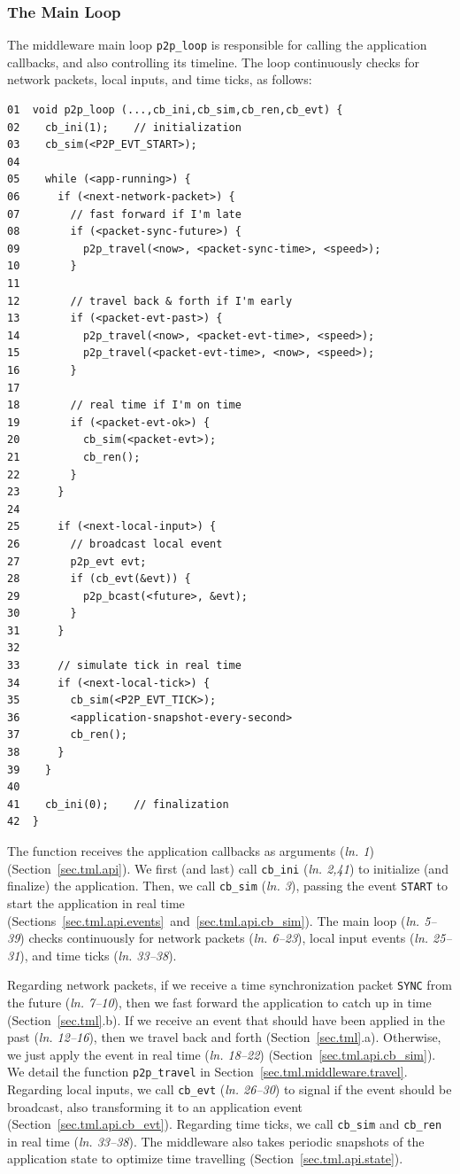 \documentclass[10pt,journal,compsoc]{IEEEtran}
\newcommand{\code}[1]  {\texttt{\footnotesize{#1}}}
\newcommand{\lin}[1]{(\emph{ln. #1}\xspace)}
\begin{document}
\subsubsection{The Main Loop}
\label{sec.tml.middleware.loop}

The middleware main loop \code{p2p\_loop} is responsible for calling the
application callbacks, and also controlling its timeline.
The loop continuously checks for network packets, local inputs, and time ticks,
as follows:

{\footnotesize
\begin{verbatim}
01  void p2p_loop (...,cb_ini,cb_sim,cb_ren,cb_evt) {
02    cb_ini(1);    // initialization
03    cb_sim(<P2P_EVT_START>);
04
05    while (<app-running>) {
06      if (<next-network-packet>) {
07        // fast forward if I'm late
08        if (<packet-sync-future>) {
09          p2p_travel(<now>, <packet-sync-time>, <speed>);
10        }
11
12        // travel back & forth if I'm early
13        if (<packet-evt-past>) {
14          p2p_travel(<now>, <packet-evt-time>, <speed>);
15          p2p_travel(<packet-evt-time>, <now>, <speed>);
16        }
17
18        // real time if I'm on time
19        if (<packet-evt-ok>) {
20          cb_sim(<packet-evt>);
21          cb_ren();
22        }
23      }
24
25      if (<next-local-input>) {
26        // broadcast local event
27        p2p_evt evt;
28        if (cb_evt(&evt)) {
29          p2p_bcast(<future>, &evt);
30        }
31      }
32
33      // simulate tick in real time
34      if (<next-local-tick>) {
35        cb_sim(<P2P_EVT_TICK>);
36        <application-snapshot-every-second>
37        cb_ren();
38      }
39    }
40
41    cb_ini(0);    // finalization
42  }
\end{verbatim}
}

The function receives the application callbacks as arguments \lin{1}
(Section~\ref{sec.tml.api}).
We first (and last) call \code{cb\_ini} \lin{2,41} to initialize (and finalize)
the application.
Then, we call \code{cb\_sim} \lin{3}, passing the event \code{START} to start
the application in real time
(Sections~\ref{sec.tml.api.events}~and~\ref{sec.tml.api.cb_sim}).
The main loop \lin{5--39} checks continuously for network packets \lin{6--23},
local input events \lin{25--31}, and time ticks \lin{33--38}.

Regarding network packets, if we receive a time synchronization packet
\code{SYNC} from the future \lin{7--10}, then we fast forward the application
to catch up in time (Section~\ref{sec.tml}.b).
If we receive an event that should have been applied in the past \lin{12--16},
then we travel back and forth (Section~\ref{sec.tml}.a).
Otherwise, we just apply the event in real time \lin{18--22}
(Section~\ref{sec.tml.api.cb_sim}).
We detail the function \code{p2p\_travel} in
Section~\ref{sec.tml.middleware.travel}.
%
Regarding local inputs, we call \code{cb\_evt} \lin{26--30} to signal if the
event should be broadcast, also transforming it to an application event
(Section~\ref{sec.tml.api.cb_evt}).
%
Regarding time ticks, we call \code{cb\_sim} and \code{cb\_ren} in real time
\lin{33--38}.
The middleware also takes periodic snapshots of the application state to
optimize time travelling (Section~\ref{sec.tml.api.state}).
\end{document}
